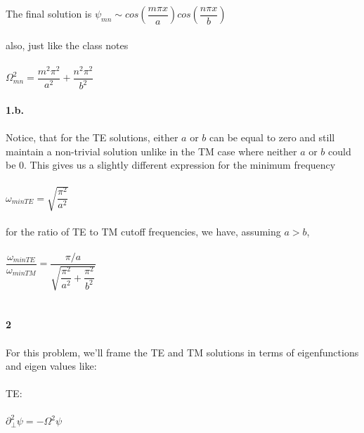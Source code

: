 \documentclass[prb,preprint]
{revtex4-1}
\newcommand{\PRLsep}{\noindent\makebox[\linewidth]{\resizebox{0.8888\linewidth}{2pt}{$\bullet$}}\bigskip}
\begin{document}
The final solution is 
$\psi_{mn} \sim cos\left(\dfrac{m\pi x}{a}\right)cos\left(\dfrac{n\pi x}{b}\right)$
\\
\\
also, just like the class notes
\\
\\
$\Omega^2_{mn} = \dfrac{m^2\pi^2}{a^2} + \dfrac{n^2\pi^2}{b^2}$
\\
\\
\textbf{1.b.}
\\
\\
Notice, that for the TE solutions, either $a$ or $b$ can be equal to zero and still maintain a non-trivial solution unlike in the TM case where neither $a$ or $b$ could be 0.  This gives us a slightly different expression for the minimum frequency 
\\
\\
$\omega_{minTE} = \sqrt{\dfrac{\pi^2}{a^2}}$
\\
\\
for the ratio of TE to TM cutoff frequencies, we have, assuming $a > b$,
\\
\\
$\dfrac{\omega_{minTE}}{\omega_{minTM}} = \dfrac{\pi/a}{\sqrt{\dfrac{\pi^2}{a^2} + \dfrac{\pi^2}{b^2}}}$
\\
\\
\PRLsep
\\
\newpage
\textbf{2}
\\
\\
For this problem, we'll frame the TE and TM solutions in terms of eigenfunctions and eigen values like:
\\
\\
TE:
\\
\\
$\partial_\perp^2 \psi = -\Omega^2 \psi$
\\
\\
\\
\\
\\
\\
\PRLsep
\\
\\

\end{document}
